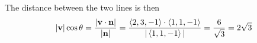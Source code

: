 \begin{solution}
\begin{itemize}
\end{itemize}
The distance between the two lines is then
\begin{equation*}
|\mathbf{v}|\cos\theta = \frac{|\mathbf{v}\cdot\mathbf{n}|}{|\mathbf{n}|}
=\frac{\left< 2,3,-1\right> \cdot\left< 1,1,-1\right>}{|\left< 1,1,-1\right>|}
=\frac{6}{\sqrt{3}}
=2\sqrt{3}
\end{equation*}

\end{solution}

